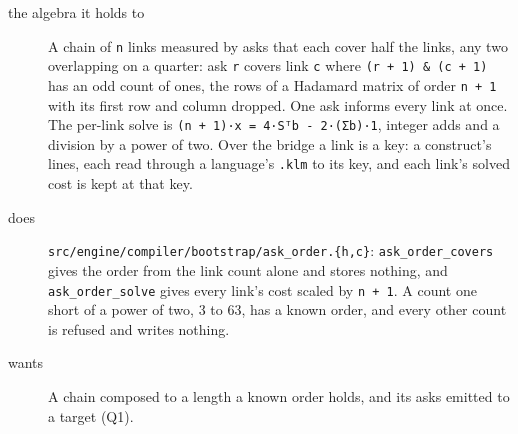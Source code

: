 \begin{description}
\item[{the algebra it holds to}] A chain of \texttt{n} links measured by asks that each cover half the links, any two overlapping on a quarter: ask \texttt{r} covers link \texttt{c} where \texttt{(r + 1) \& (c + 1)} has an odd count of ones, the rows of a Hadamard matrix of order \texttt{n + 1} with its first row and column dropped. One ask informs every link at once. The per-link solve is \texttt{(n + 1)·x = 4·Sᵀb -\allowbreak{} 2·(Σb)·1}, integer adds and a division by a power of two. Over the bridge a link is a key: a construct's lines, each read through a language's \texttt{.\allowbreak{}klm} to its key, and each link's solved cost is kept at that key.
\item[{does}] \texttt{src/\allowbreak{}engine/\allowbreak{}compiler/\allowbreak{}bootstrap/\allowbreak{}ask\_\allowbreak{}order.\allowbreak{}\{h,c\}}: \texttt{ask\_\allowbreak{}order\_\allowbreak{}covers} gives the order from the link count alone and stores nothing, and \texttt{ask\_\allowbreak{}order\_\allowbreak{}solve} gives every link's cost scaled by \texttt{n + 1}. A count one short of a power of two, 3 to 63, has a known order, and every other count is refused and writes nothing.
\item[{wants}] A chain composed to a length a known order holds, and its asks emitted to a target (Q1).

\end{description}
